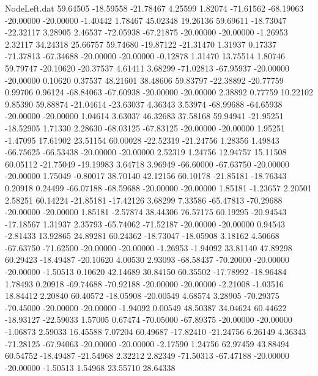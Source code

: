 \begin{filecontents}{NodeLeft.dat}
  59.64505  -18.59558  -21.78467     4.25599    1.82074  -71.61562  -68.19063  -20.00000  -20.00000   -1.40442    1.78467   45.02348   19.26136
  59.69611  -18.73047  -22.32117     3.28905    2.46537  -72.05938  -67.21875  -20.00000  -20.00000   -1.26953    2.32117   34.24318   25.66757
  59.74680  -19.87122  -21.31470     1.31937    0.17337  -71.37813  -67.34688  -20.00000  -20.00000   -0.12878    1.31470   13.75514    1.80746
  59.79747  -20.10620  -20.37537     4.61411    3.68299  -71.02813  -67.95937  -20.00000  -20.00000    0.10620    0.37537   48.21601   38.48606
  59.83797  -22.38892  -20.77759     0.99706    0.96124  -68.84063  -67.60938  -20.00000  -20.00000    2.38892    0.77759   10.22102    9.85390
  59.88874  -21.04614  -23.63037     4.36343    3.53974  -68.99688  -64.65938  -20.00000  -20.00000    1.04614    3.63037   46.32683   37.58168
  59.94941  -21.95251  -18.52905     1.71330    2.28630  -68.03125  -67.83125  -20.00000  -20.00000    1.95251   -1.47095   17.61902   23.51154
  60.00028  -22.52319  -21.24756     1.28356    1.49843  -66.75625  -66.53438  -20.00000  -20.00000    2.52319    1.24756   12.94757   15.11508
  60.05112  -21.75049  -19.19983     3.64718    3.96949  -66.60000  -67.63750  -20.00000  -20.00000    1.75049   -0.80017   38.70140   42.12156
  60.10178  -21.85181  -18.76343     0.20918    0.24499  -66.07188  -68.59688  -20.00000  -20.00000    1.85181   -1.23657    2.20501    2.58251
  60.14224  -21.85181  -17.42126     3.68299    7.33586  -65.47813  -70.29688  -20.00000  -20.00000    1.85181   -2.57874   38.44306   76.57175
  60.19295  -20.94543  -17.18567     1.31937    2.35793  -65.74062  -71.52187  -20.00000  -20.00000    0.94543   -2.81433   13.92865   24.89281
  60.24362  -18.73047  -18.05908     3.18162    4.50668  -67.63750  -71.62500  -20.00000  -20.00000   -1.26953   -1.94092   33.81140   47.89298
  60.29423  -18.49487  -20.10620     4.00530    2.93093  -68.58437  -70.20000  -20.00000  -20.00000   -1.50513    0.10620   42.14689   30.84150
  60.35502  -17.78992  -18.96484     1.78493    0.20918  -69.74688  -70.92188  -20.00000  -20.00000   -2.21008   -1.03516   18.84412    2.20840
  60.40572  -18.05908  -20.00549     4.68574    3.28905  -70.29375  -70.45000  -20.00000  -20.00000   -1.94092    0.00549   48.50387   34.04624
  60.44622  -18.93127  -22.59033     1.57005    0.67474  -70.05000  -67.89375  -20.00000  -20.00000   -1.06873    2.59033   16.45588    7.07204
  60.49687  -17.82410  -21.24756     6.26149    4.36343  -71.28125  -67.94063  -20.00000  -20.00000   -2.17590    1.24756   62.97459   43.88494
  60.54752  -18.49487  -21.54968     2.32212    2.82349  -71.50313  -67.47188  -20.00000  -20.00000   -1.50513    1.54968   23.55710   28.64338

\end{filecontents}
